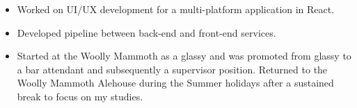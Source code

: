 \documentclass[10pt, a4paper]{altacv}
\begin{document}
    \singlespacing
    \begin{fullwidth}
    \makecvheader
    \end{fullwidth}
        \begin{itemize}
            \item Worked on UI/UX development for a multi-platform application in React.
            \item Developed pipeline between back-end and front-end services.
       \end{itemize}
        \divider
        \begin{itemize}
            \item Started at the Woolly Mammoth as a glassy and was promoted from glassy to a bar attendant and subsequently a supervisor position. Returned to the Woolly Mammoth Alehouse during the Summer holidays after a sustained break to focus on my studies.
        \end{itemize}
\end{document}
